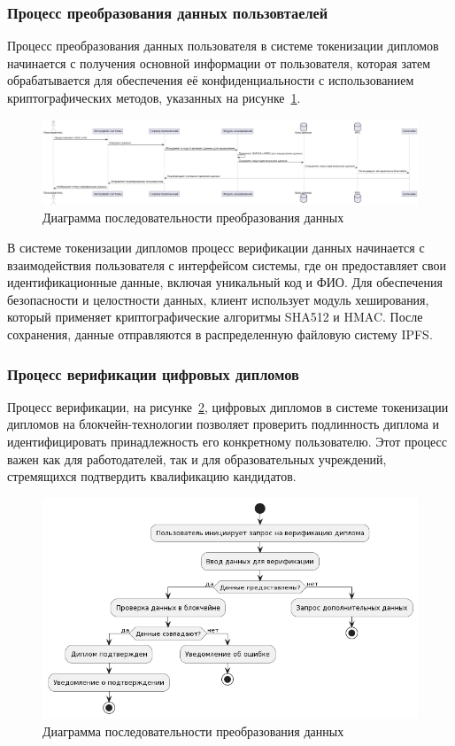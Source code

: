 \subsubsection{Процесс преобразования данных пользовтаелей}

Процесс преобразования данных пользователя в системе токенизации дипломов начинается с получения основной информации от пользователя, которая затем обрабатывается для обеспечения её конфиденциальности с использованием криптографических методов, указанных на рисунке~\ref{fig:data_proc}.

\begin{figure}[H]
	\centering
	\includegraphics[width=.9\textwidth]{images/data_proc.png}
	\parskip=6pt
	\caption{Диаграмма последовательности преобразования данных}
	\label{fig:data_proc}
\end{figure}

В системе токенизации дипломов процесс верификации данных начинается с взаимодействия пользователя с интерфейсом системы, где он предоставляет свои идентификационные данные, включая уникальный код и ФИО. Для обеспечения безопасности и целостности данных, клиент использует модуль хеширования, который применяет криптографические алгоритмы SHA512 и HMAC. После сохранения, данные отправляются в распределенную файловую систему IPFS.

\subsubsection{Процесс верификации цифровых дипломов}

Процесс верификации, на рисунке~\ref{fig:diploma_verif}, цифровых дипломов в системе токенизации дипломов на блокчейн-технологии позволяет проверить подлинность диплома и идентифицировать принадлежность его конкретному пользователю. Этот процесс важен как для работодателей, так и для образовательных учреждений, стремящихся подтвердить квалификацию кандидатов.

\begin{figure}[H]
	\centering
	\includegraphics[width=.9\textwidth]{images/diploma_verif.png}
	\parskip=6pt
	\caption{Диаграмма последовательности преобразования данных}
	\label{fig:diploma_verif}
\end{figure}

